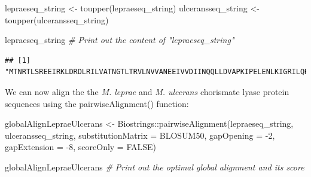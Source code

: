\documentclass[
]{book}
\newenvironment{Shaded}{\begin{snugshade}}{\end{snugshade}}
\newcommand{\AttributeTok}[1]{\textcolor[rgb]{0.77,0.63,0.00}{#1}}
\newcommand{\CommentTok}[1]{\textcolor[rgb]{0.56,0.35,0.01}{\textit{#1}}}
\newcommand{\ConstantTok}[1]{\textcolor[rgb]{0.00,0.00,0.00}{#1}}
\newcommand{\DecValTok}[1]{\textcolor[rgb]{0.00,0.00,0.81}{#1}}
\newcommand{\FunctionTok}[1]{\textcolor[rgb]{0.00,0.00,0.00}{#1}}
\newcommand{\NormalTok}[1]{#1}
\newcommand{\OtherTok}[1]{\textcolor[rgb]{0.56,0.35,0.01}{#1}}
\newcommand{\SpecialCharTok}[1]{\textcolor[rgb]{0.00,0.00,0.00}{#1}}
\begin{document}
\begin{Shaded}
\begin{Highlighting}[]
\NormalTok{lepraeseq\_string }\OtherTok{\textless{}{-}} \FunctionTok{toupper}\NormalTok{(lepraeseq\_string)}
\NormalTok{ulceransseq\_string }\OtherTok{\textless{}{-}} \FunctionTok{toupper}\NormalTok{(ulceransseq\_string)}
\end{Highlighting}
\end{Shaded}

\begin{Shaded}
\begin{Highlighting}[]
\NormalTok{lepraeseq\_string }\CommentTok{\# Print out the content of "lepraeseq\_string"}
\end{Highlighting}
\end{Shaded}

\begin{verbatim}
## [1] "MTNRTLSREEIRKLDRDLRILVATNGTLTRVLNVVANEEIVVDIINQQLLDVAPKIPELENLKIGRILQRDILLKGQKSGILFVAAESLIVIDLLPTAITTYLTKTHHPIGEIMAASRIETYKEDAQVWIGDLPCWLADYGYWDLPKRAVGRRYRIIAGGQPVIITTEYFLRSVFQDTPREELDRCQYSNDIDTRSGDRFVLHGRVFKNL"
\end{verbatim}

We can now align the the \emph{M. leprae} and \emph{M. ulcerans} chorismate lyase protein sequences using the pairwiseAlignment() function:

\begin{Shaded}
\begin{Highlighting}[]
\NormalTok{globalAlignLepraeUlcerans }\OtherTok{\textless{}{-}}\NormalTok{ Biostrings}\SpecialCharTok{::}\FunctionTok{pairwiseAlignment}\NormalTok{(lepraeseq\_string, }
\NormalTok{                                               ulceransseq\_string,}
                                               \AttributeTok{substitutionMatrix =}\NormalTok{ BLOSUM50, }
                                               \AttributeTok{gapOpening =} \SpecialCharTok{{-}}\DecValTok{2}\NormalTok{, }
                                               \AttributeTok{gapExtension =} \SpecialCharTok{{-}}\DecValTok{8}\NormalTok{, }
                                               \AttributeTok{scoreOnly =} \ConstantTok{FALSE}\NormalTok{)}
\end{Highlighting}
\end{Shaded}

\begin{Shaded}
\begin{Highlighting}[]
\NormalTok{globalAlignLepraeUlcerans }\CommentTok{\# Print out the optimal global alignment and its score}
\end{Highlighting}
\end{Shaded}
\end{document}
